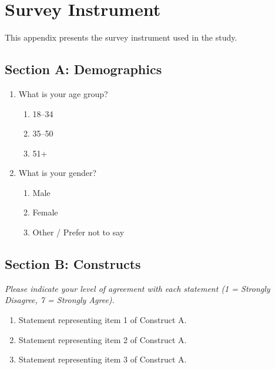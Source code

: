 
\section{Survey Instrument}
\label{app:survey}

This appendix presents the survey instrument used in the study.

\subsection{Section A: Demographics}
\begin{enumerate}
    \item What is your age group?
    \begin{enumerate}[label=\alph*)]
        \item 18–34
        \item 35–50
        \item 51+
    \end{enumerate}

    \item What is your gender?
    \begin{enumerate}[label=\alph*)]
        \item Male
        \item Female
        \item Other / Prefer not to say
    \end{enumerate}
\end{enumerate}

\subsection{Section B: Constructs}
\noindent\textit{Please indicate your level of agreement with each statement
(1 = Strongly Disagree, 7 = Strongly Agree).}

\begin{enumerate}
    \item Statement representing item 1 of Construct A.
    \item Statement representing item 2 of Construct A.
    \item Statement representing item 3 of Construct A.
\end{enumerate}
